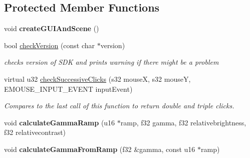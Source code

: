 \subsection*{Protected Member Functions}
\begin{DoxyCompactItemize}
\item 
\hypertarget{classirr_1_1_c_irr_device_stub_ac8fe4fdf4a1f44821f4a2df358524517}{void {\bfseries create\-G\-U\-I\-And\-Scene} ()}\label{classirr_1_1_c_irr_device_stub_ac8fe4fdf4a1f44821f4a2df358524517}

\item 
bool \hyperlink{classirr_1_1_c_irr_device_stub_af4646194fc19af668ba28e7566bbf743}{check\-Version} (const char $\ast$version)
\begin{DoxyCompactList}\small\item\em checks version of S\-D\-K and prints warning if there might be a problem \end{DoxyCompactList}\item 
virtual u32 \hyperlink{classirr_1_1_c_irr_device_stub_a1fcc072833c7fc240f739bd9a9070c2e}{check\-Successive\-Clicks} (s32 mouse\-X, s32 mouse\-Y, E\-M\-O\-U\-S\-E\-\_\-\-I\-N\-P\-U\-T\-\_\-\-E\-V\-E\-N\-T input\-Event)
\begin{DoxyCompactList}\small\item\em Compares to the last call of this function to return double and triple clicks. \end{DoxyCompactList}\item 
\hypertarget{classirr_1_1_c_irr_device_stub_ad527d15f00e7689bbdc5c5a1d2680084}{void {\bfseries calculate\-Gamma\-Ramp} (u16 $\ast$ramp, f32 gamma, f32 relativebrightness, f32 relativecontrast)}\label{classirr_1_1_c_irr_device_stub_ad527d15f00e7689bbdc5c5a1d2680084}

\item 
\hypertarget{classirr_1_1_c_irr_device_stub_a491ca37ad95c1c344185c97e53a673cc}{void {\bfseries calculate\-Gamma\-From\-Ramp} (f32 \&gamma, const u16 $\ast$ramp)}\label{classirr_1_1_c_irr_device_stub_a491ca37ad95c1c344185c97e53a673cc}

\end{DoxyCompactItemize}
